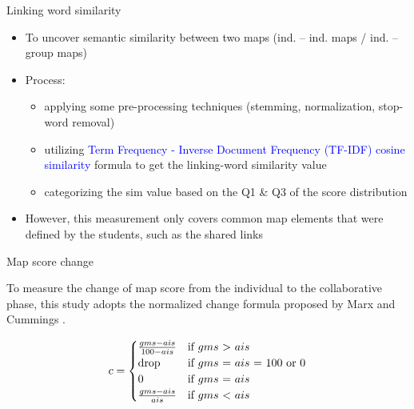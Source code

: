 \begin{frame}{Linking word similarity}
    \begin{itemize}
        \item To uncover semantic similarity between two maps (ind. -- ind. maps / ind. -- group maps)
        
        \item Process:
        \begin{itemize}
            \item applying some pre-processing techniques (stemming, normalization, stop-word removal)
            \item utilizing \textcolor{blue}{Term Frequency - Inverse Document Frequency (TF-IDF) cosine similarity} formula to get the linking-word similarity value
            \item categorizing the sim value based on the Q1 \& Q3 of the score distribution
        \end{itemize}
        \item However,  this  measurement only covers common map elements that were defined by the students, such as the shared links
        
    \end{itemize}
\end{frame}

\begin{frame}{Map score change}

To measure the change of map score from the individual to the collaborative phase, this 
study adopts the normalized change formula proposed by Marx and Cummings \cite{Marx2007NormalizedChange}.

\begin{equation}
 c =
    \begin{cases}
        \frac{gms - ais}{100 - ais} & \text{if $gms$ > $ais$}\\
        $drop$ & \text{if $gms$ = $ais$ = 100 or 0} \\
        0 & \text{if $gms$ = $ais$}\\
        \frac{gms - ais}{ais} & \text{if $gms$ < $ais$}
    \end{cases}
\end{equation}
    
\end{frame}


